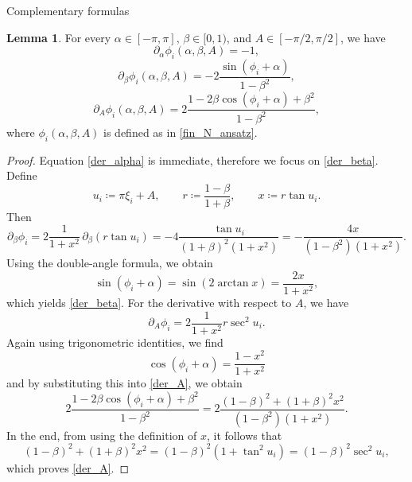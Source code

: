 \documentclass{article}
\theoremstyle{definition}
\newtheorem{lemma}[definition]{Lemma}
\begin{document}
\begin{section}{Complementary formulas}
\begin{lemma}\label{chain_rule}
For every $\alpha\in[-\pi,\pi]$, $\beta\in[0,1)$, and $A\in[-\pi/2,\pi/2]$, we have
\begin{equation}\label{der_alpha}
    \partial_\alpha\phi_i(\alpha,\beta,A)=-1,
\end{equation}
\begin{equation}\label{der_beta}
\partial_\beta\phi_i(\alpha,\beta,A)=-2\frac{\sin(\phi_i+\alpha)}{1-\beta^2},
\end{equation}
\begin{equation}\label{der_A}
    \partial_A\phi_i(\alpha,\beta,A)=2\frac{1-2\beta\cos(\phi_i+\alpha)+\beta^2}{1-\beta^2},
\end{equation}
where $\phi_i(\alpha,\beta,A)$ is defined as in \eqref{fin_N_ansatz}.
\end{lemma}

\begin{proof}
Equation \eqref{der_alpha} is immediate, therefore we focus on \eqref{der_beta}. Define
$$u_i\coloneqq\pi\xi_i+A,\qquad r\coloneqq\frac{1-\beta}{1+\beta},\qquad x\coloneqq r\tan u_i.$$
Then
$$\partial_\beta\phi_i
=2\frac{1}{1+x^2}\,\partial_\beta(r\tan u_i)
=-4\frac{\tan u_i}{(1+\beta)^2(1+x^2)}
=-\frac{4x}{(1-\beta^2)(1+x^2)}.$$
Using the double-angle formula, we obtain
$$\sin(\phi_i+\alpha)=\sin(2\arctan x)=\frac{2x}{1+x^2},$$
which yields \eqref{der_beta}. For the derivative with respect to $A$, we have
$$\partial_A \phi_i=2\frac{1}{1+x^2}r\sec^2 u_i.$$
Again using trigonometric identities, we find
$$\cos(\phi_i+\alpha)=\frac{1-x^2}{1+x^2}$$
and by substituting this into \eqref{der_A}, we obtain
$$2\frac{1-2\beta\cos(\phi_i+\alpha)+\beta^2}{1-\beta^2}
=2\frac{(1-\beta)^2+(1+\beta)^2x^2}{(1-\beta^2)(1+x^2)}.$$
In the end, from using the definition of $x$, it follows that
$$(1-\beta)^2+(1+\beta)^2x^2=(1-\beta)^2(1+\tan^2 u_i)=(1-\beta)^2\sec^2 u_i,$$
which proves \eqref{der_A}.
\end{proof}
\end{section}
\end{document}
